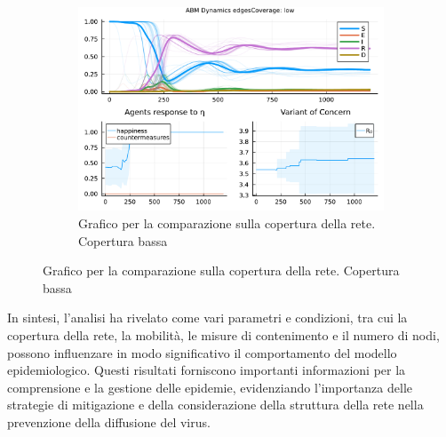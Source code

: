 \begin{figure}[!hb]
\begin{subfigure}[b]{0.3\textwidth}
		\includegraphics[width=\textwidth]{img/SocialNetworkABM_3_EC.pdf}
		\caption{Grafico per la comparazione sulla copertura della rete. Copertura bassa}
		\label{fig:comparison_lowCoverage}
	\end{subfigure}
\end{figure}

In sintesi, l'analisi ha rivelato come vari parametri e condizioni, 
tra cui la copertura della rete, la mobilità, le misure di contenimento 
e il numero di nodi, possono influenzare in modo significativo il 
comportamento del modello epidemiologico. Questi risultati forniscono 
importanti informazioni per la comprensione e la gestione delle epidemie, 
evidenziando l'importanza delle strategie di mitigazione e della 
considerazione della struttura della rete nella prevenzione della 
diffusione del virus.
